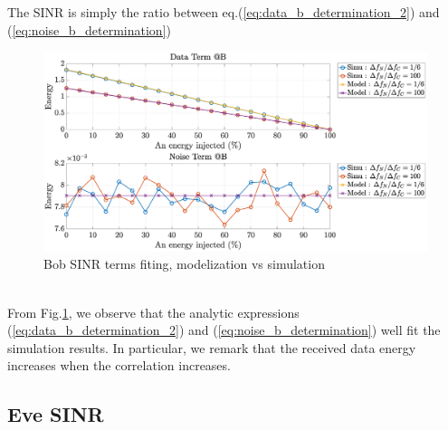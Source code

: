 \documentclass[12pt]{article}
\begin{document}
The SINR is simply the ratio between eq.(\ref{eq:data_b_determination_2}) and (\ref{eq:noise_b_determination})
\begin{figure}[htb!]
	\centering
	\includegraphics[width=.88\linewidth]{img/bob_sinr_terms_fit.eps}
	\caption{Bob SINR terms fiting, modelization vs simulation}
	\label{fig:SINR_terms_fits}
\end{figure} \\
From Fig.\ref{fig:SINR_terms_fits}, we observe that the analytic expressions (\ref{eq:data_b_determination_2}) and (\ref{eq:noise_b_determination}) well fit the simulation results. In particular, we remark that the received data energy increases when the correlation increases. 


\subsection{Eve SINR}
\end{document}
